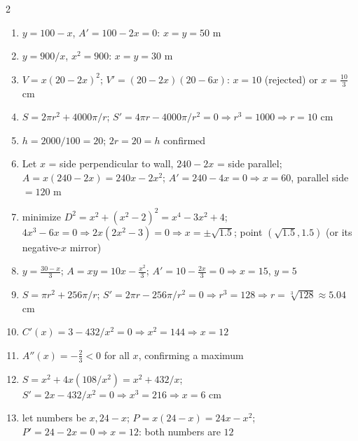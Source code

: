 \documentclass[11pt]{article}
\begin{document}
\begin{keybox}
\begin{multicols}{2}
\small
\begin{enumerate}[leftmargin=*,itemsep=3pt]
  \item $y=100-x$, $A'=100-2x=0$: $x=y=50$ m
  \item $y=900/x$, $x^2=900$: $x=y=30$ m
  \item $V=x(20-2x)^2$; $V'=(20-2x)(20-6x)$: $x=10$ (rejected) or $x=\tfrac{10}3$ cm
  \item $S=2\pi r^2+4000\pi/r$; $S'=4\pi r-4000\pi/r^2=0\Rightarrow r^3=1000\Rightarrow r=10$ cm
  \item $h=2000/100=20$; $2r=20=h$ confirmed
  \item Let $x$ = side perpendicular to wall, $240-2x$ = side parallel; $A=x(240-2x)=240x-2x^2$; $A'=240-4x=0\Rightarrow x=60$, parallel side $=120$ m
  \item minimize $D^2=x^2+(x^2-2)^2=x^4-3x^2+4$; $4x^3-6x=0\Rightarrow2x(2x^2-3)=0\Rightarrow x=\pm\sqrt{1.5}$; point $(\sqrt{1.5},1.5)$ (or its negative-$x$ mirror)
  \item $y=\tfrac{30-x}3$; $A=xy=10x-\tfrac{x^2}3$; $A'=10-\tfrac{2x}3=0\Rightarrow x=15$, $y=5$
  \item $S=\pi r^2+256\pi/r$; $S'=2\pi r-256\pi/r^2=0\Rightarrow r^3=128\Rightarrow r=\sqrt[3]{128}\approx5.04$ cm
  \item $C'(x)=3-432/x^2=0\Rightarrow x^2=144\Rightarrow x=12$
  \item $A''(x)=-\tfrac23<0$ for all $x$, confirming a maximum
  \item $S=x^2+4x(108/x^2)=x^2+432/x$; $S'=2x-432/x^2=0\Rightarrow x^3=216\Rightarrow x=6$ cm
  \item let numbers be $x,24-x$; $P=x(24-x)=24x-x^2$; $P'=24-2x=0\Rightarrow x=12$: both numbers are $12$
\end{enumerate}
\end{multicols}
\end{keybox}
\end{document}
